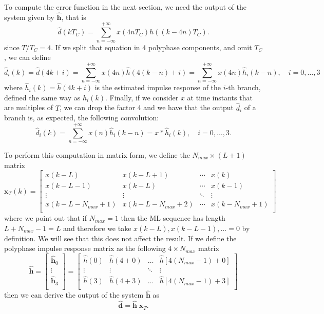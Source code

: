 \documentclass[10pt]{article}
\begin{document}
To compute the error function in the next section, we need the output of the system given by $\hat{\mathbf{h}}$, that is
\begin{equation}
	\hat{d}(kT_C) = \sum_{n=-\infty}^{+\infty} x(4nT_C)\hat{h}((k-4n)T_C).
\end{equation}
since $T/T_C=4$. If we split that equation in 4 polyphase components, and omit $T_C$, we can define
\begin{equation}
	\hat{d}_i(k) = \hat{d}(4k+i) = \sum_{n=-\infty}^{+\infty} x(4n)\hat{h}(4(k-n)+i) = \sum_{n=-\infty}^{+\infty} x(4n)\hat{h}_i(k-n),\quad i=0,\ldots,3
\end{equation}
where $\hat{h}_i(k) = \hat{h}(4k+i)$ is the estimated impulse response of the $i$-th branch, defined the same way as $h_i(k)$. Finally, if we consider $x$ at time instants that are multiples of $T$, we can drop the factor 4 and we have that the output $\hat{d}_i$ of a branch is, as expected, the following convolution:
\begin{equation}
	\hat{d}_i(k) = \sum_{n=-\infty}^{+\infty} x(n)\hat{h}_i(k-n) = x \ast \hat{h}_i (k) ,\quad i=0,\ldots,3.
\end{equation}

To perform this computation in matrix form, we define the $N_{max} \times (L+1)$ matrix
\begin{equation}
\mathbf{x}_T(k) =
 \begin{bmatrix}
  x(k-L) & x(k-L+1) & \cdots & x(k) \\
  x(k-L-1) & x(k-L) & \cdots & x(k-1) \\
  \vdots  & \vdots  & \ddots & \vdots  \\
  x(k-L-N_{max}+1) & x(k-L-N_{max}+2) & \cdots & x(k-N_{max}+1) \\
 \end{bmatrix}
\end{equation}
where we point out that if $N_{max} = 1$ then the ML sequence has length $L+N_{max}-1 = L$ and therefore we take $x(k-L), x(k-L-1), \ldots = 0$ by definition. We will see that this does not affect the result. If we define the polyphase impulse response matrix as the following $4\times N_{max}$ matrix
\begin{equation}
\mathbf{\hat{h}} =
 \begin{bmatrix}
  \mathbf{\hat{h}}_0 \\
  \vdots  \\
  \mathbf{\hat{h}}_3 \\
 \end{bmatrix} =
 \begin{bmatrix}
  \hat{h}(0) & \hat{h}(4+0) & \ldots & \hat{h}\left[4(N_{max}-1) + 0\right] \\
  \vdots  & \vdots  & \ddots & \vdots  \\
  \hat{h}(3) & \hat{h}(4+3) & \ldots & \hat{h}\left[4(N_{max}-1) + 3\right]\\
 \end{bmatrix}
\end{equation}
then we can derive the output of the system $\hat{\mathbf{h}}$ as
\begin{equation}
	\hat{\mathbf{d}} = \hat{\mathbf{h}} \; \mathbf{x}_T.
\end{equation}
\end{document}

